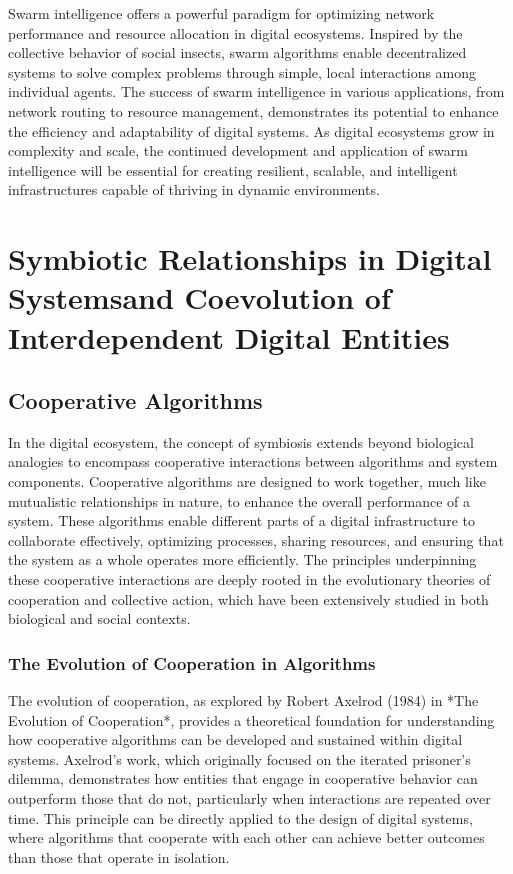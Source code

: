\documentclass[12pt,twoside]{article}
\begin{document}
Swarm intelligence offers a powerful paradigm for optimizing network performance and resource allocation in digital ecosystems. Inspired by the collective behavior of social insects, swarm algorithms enable decentralized systems to solve complex problems through simple, local interactions among individual agents. The success of swarm intelligence in various applications, from network routing to resource management, demonstrates its potential to enhance the efficiency and adaptability of digital systems. As digital ecosystems grow in complexity and scale, the continued development and application of swarm intelligence will be essential for creating resilient, scalable, and intelligent infrastructures capable of thriving in dynamic environments.

\section{Symbiotic Relationships in Digital Systemsand Coevolution of Interdependent Digital Entities}

\subsection{Cooperative Algorithms}

In the digital ecosystem, the concept of symbiosis extends beyond biological analogies to encompass cooperative interactions between algorithms and system components. Cooperative algorithms are designed to work together, much like mutualistic relationships in nature, to enhance the overall performance of a system. These algorithms enable different parts of a digital infrastructure to collaborate effectively, optimizing processes, sharing resources, and ensuring that the system as a whole operates more efficiently. The principles underpinning these cooperative interactions are deeply rooted in the evolutionary theories of cooperation and collective action, which have been extensively studied in both biological and social contexts.

\subsubsection{The Evolution of Cooperation in Algorithms}

The evolution of cooperation, as explored by Robert Axelrod (1984) in *The Evolution of Cooperation*, provides a theoretical foundation for understanding how cooperative algorithms can be developed and sustained within digital systems. Axelrod's work, which originally focused on the iterated prisoner’s dilemma, demonstrates how entities that engage in cooperative behavior can outperform those that do not, particularly when interactions are repeated over time. This principle can be directly applied to the design of digital systems, where algorithms that cooperate with each other can achieve better outcomes than those that operate in isolation.
\end{document}
